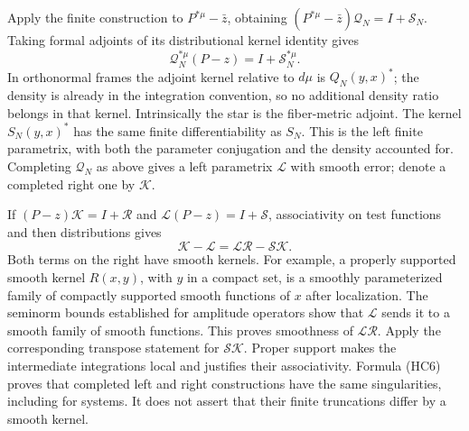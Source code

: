 \documentclass[
  11pt,
]{article}
\begin{document}
Apply the finite construction to \(P^{*\mu}-\bar z\), obtaining
\((P^{*\mu}-\bar z)\mathcal Q_N=I+\mathcal S_N\). Taking formal adjoints
of its distributional kernel identity gives \[
                      \mathcal Q_N^{*\mu}(P-z)=I+\mathcal S_N^{*\mu}.
                                                               \tag{HC5}
\] In orthonormal frames the adjoint kernel relative to \(d\mu\) is
\(Q_N(y,x)^*\); the density is already in the integration convention, so
no additional density ratio belongs in that kernel. Intrinsically the
star is the fiber-metric adjoint. The kernel \(S_N(y,x)^*\) has the same
finite differentiability as \(S_N\). This is the left finite parametrix,
with both the parameter conjugation and the density accounted for.
Completing \(\mathcal Q_N\) as above gives a left parametrix
\(\mathcal L\) with smooth error; denote a completed right one by
\(\mathcal K\).

If \((P-z)\mathcal K=I+\mathcal R\) and
\(\mathcal L(P-z)=I+\mathcal S\), associativity on test functions and
then distributions gives \[
                  \mathcal K-\mathcal L
                       =\mathcal L\mathcal R-\mathcal S\mathcal K.
                                                               \tag{HC6}
\] Both terms on the right have smooth kernels. For example, a properly
supported smooth kernel \(R(x,y)\), with \(y\) in a compact set, is a
smoothly parameterized family of compactly supported smooth functions of
\(x\) after localization. The seminorm bounds established for amplitude
operators show that \(\mathcal L\) sends it to a smooth family of smooth
functions. This proves smoothness of \(\mathcal L\mathcal R\). Apply the
corresponding transpose statement for \(\mathcal S\mathcal K\). Proper
support makes the intermediate integrations local and justifies their
associativity. Formula (HC6) proves that completed left and right
constructions have the same singularities, including for systems. It
does not assert that their finite truncations differ by a smooth kernel.
\end{document}
